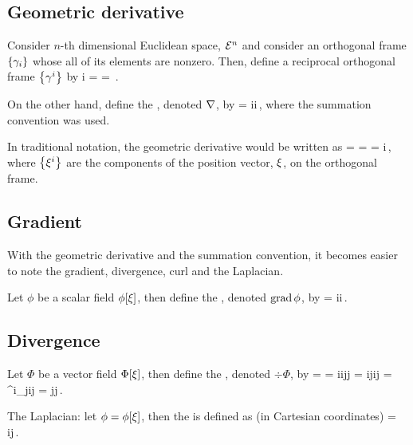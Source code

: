 \subsection{Geometric derivative}
Consider $n$-th dimensional Euclidean space, $\mathcal{\mathcal{E}}^{n}$ and consider an orthogonal frame $\left\lbrace{\gamma_{i}}\right\rbrace$ whose all of its elements are nonzero. Then, define a reciprocal orthogonal frame $\left\lbrace{\gamma^{i}}\right\rbrace$ by
\beq
\rbvec i =  = \,.
\eeq

On the other hand, define the , denoted $\nabla$, by
\beq
\gder = \rbvec i\igd i\,,
\eeq
where the summation convention was used.

In traditional notation, the geometric derivative would be written as
\beq
\gder = 
      = 
      = \igd i\,,
\eeq
where $\left\lbrace{{\xi}^{i}}\right\rbrace$ are the components of the position vector, $\xi$, on the orthogonal frame.


\subsection{Gradient}
With the geometric derivative and the summation convention, it becomes easier to note the gradient, divergence, curl and the Laplacian.

Let $\phi$ be a scalar field $\phi\!\left[{\xi}\right]$, then define the , denoted $\operatorname{grad}\phi$, by
\beq
\grad\phi = \rbvec i\igd i\phi\,.
\eeq


\subsection{Divergence}
Let $\Phi$ be a vector field $\Phi\!\left[{\xi}\right]$, then define the , denoted $\div\Phi$, by
\beq
\div\Phi = \gder\iprod\Phi 
         = \rbvec i\igd i\iprod\fbvec j\fvec\Phi j
         = \rbvec i\iprod\fbvec j\igd i\fvec\Phi j
         = \metric^i_j\igd i\fvec\Phi j
         = \igd j\fvec\Phi j\,.         
\eeq

The Laplacian: let $\phi = \phi\!\left[{\xi}\right]$, then the  is defined as (in Cartesian coordinates)
\beq
\lap\phi = \igd i\igd j\phi\,.
\eeq


